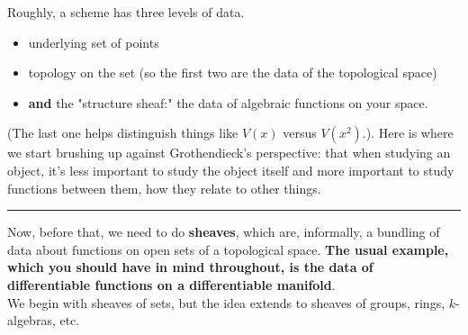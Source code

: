 \documentclass[10pt,reqno]{amsart}
\theoremstyle{definition}
\theoremstyle{remark}
\numberwithin{equation}{section}
\numberwithin{theorem}{section}
\begin{document}
Roughly, a scheme has three levels of data.
\begin{itemize}
\item underlying set of points
\item topology on the set (so the first two are the data of the topological space)
\item \textbf{and} the "structure sheaf:" the data of algebraic functions on your space.
\end{itemize}
(The last one helps distinguish things like $V(x)$ versus $V(x^2)$.).
Here is where we start brushing up against Grothendieck's perspective: that when studying an object, it's less important to study the object itself and more important to study functions between them, how they relate to other things.
\\

\hrule
\vspace{1em}

Now, before that, we need to do \textbf{sheaves}, which are, informally, a bundling of data about functions on open sets of a topological space. \textbf{The usual example, which you should have in mind throughout, is the data of differentiable functions on a differentiable manifold}.
\\

We begin with sheaves of sets, but the idea extends to sheaves of groups, rings, $k$-algebras, etc. %
\end{document}
